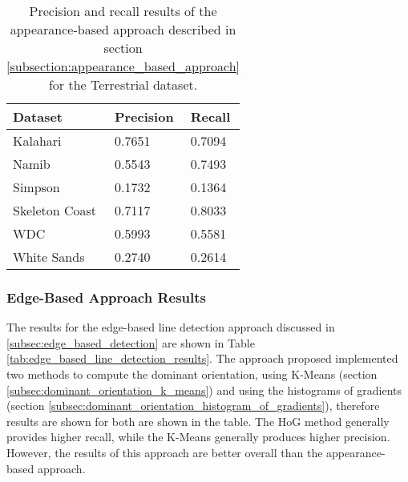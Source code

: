 \begin{table}
	\centering
	\caption{Precision and recall results of the appearance-based approach described in section \ref{subsection:appearance_based_approach} for the Terrestrial dataset.}
	\label{tab:appearance_approach_results}
	\begin{tabu} to 0.6\textwidth { | X[2,c] || X[1,c] | X[1,c] | }
		\hline
		\textbf{Dataset} & \textbf{Precision} & \textbf{Recall} \\
		\hline\hline
		Kalahari & 0.7651 & 0.7094 \\
		Namib & 0.5543 & 0.7493 \\
		Simpson & 0.1732 & 0.1364 \\
		Skeleton Coast & 0.7117 & 0.8033 \\
		WDC & 0.5993 & 0.5581 \\
		White Sands & 0.2740 & 0.2614 \\
		\hline
	\end{tabu}
\end{table}

\subsubsection*{Edge-Based Approach Results}

The results for the edge-based line detection approach discussed in  \ref{subsec:edge_based_detection} are shown in Table \ref{tab:edge_based_line_detection_results}. The approach proposed implemented two methods to compute the dominant orientation, using K-Means (section \ref{subsec:dominant_orientation_k_means}) and using the histograms of gradients (section \ref{subsec:dominant_orientation_histogram_of_gradients}), therefore results are shown for both are shown in the table. The HoG method generally provides higher recall, while the K-Means generally produces higher precision. However, the results of this approach are better overall than the appearance-based approach. 


